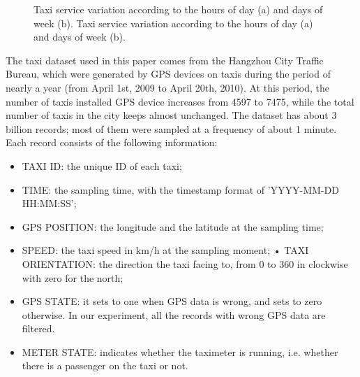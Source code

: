 \documentclass[a4paper, 10pt, conference]{ieeeconf}      %
\begin{document}
\begin{figure}[htbp]
    \centering

    \caption{ Taxi service variation according to the hours of day (a) and days of week (b). Taxi service variation according to the hours of day (a) and days of week (b).}
    \label{fig:my_png_2}
\end{figure}

The taxi dataset used in this paper comes from the Hangzhou City Traffic Bureau, which were generated by GPS devices on taxis during the period of nearly a year (from April 1st, 2009 to April 20th, 2010). At this period, the number of taxis installed GPS device increases from 4597 to 7475, while the total number of taxis in the city keeps almost unchanged. The dataset has about 3 billion records; most of them were sampled at a frequency of about 1 minute. Each record consists of the following information:

\begin{itemize}

\item TAXI ID: the unique ID of each taxi;
\item TIME: the sampling time, with the timestamp format of ’YYYY-MM-DD HH:MM:SS’;
\item GPS POSITION: the longitude and the latitude at the sampling time;
\item SPEED: the taxi speed in km/h at the sampling moment; • TAXI ORIENTATION: the direction the taxi facing to, from 0 to 360 in clockwise with zero for the north;
\item GPS STATE: it sets to one when GPS data is wrong, and sets to zero otherwise. In our experiment, all the records with wrong GPS data are filtered.
\item METER STATE: indicates whether the taximeter is running, i.e. whether there is a passenger on the taxi or not.

\end{itemize}
\end{document}
